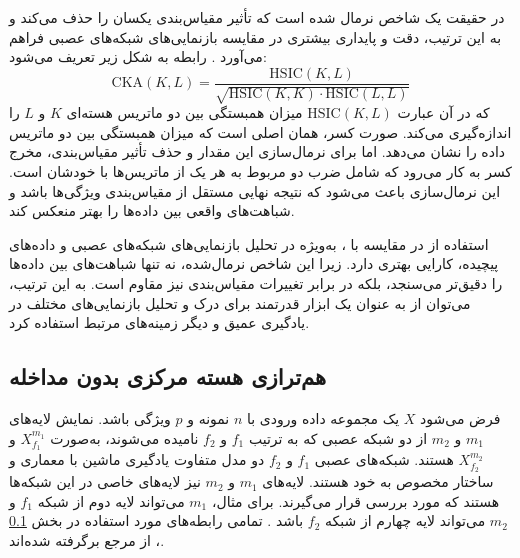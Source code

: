 در حقیقت
یک شاخص نرمال‌ شده است که تأثیر مقیاس‌بندی یکسان را حذف می‌کند و به این ترتیب، دقت و پایداری بیشتری در مقایسه بازنمایی‌های شبکه‌های عصبی فراهم می‌آورد
\cite{cortes2012algorithms, cristianini2001kernel}.
رابطه
به شکل زیر تعریف می‌شود:
\begin{equation}
	\text{CKA}(K, L) = \frac{\text{HSIC}(K, L)}{\sqrt{\text{HSIC}(K, K) \cdot \text{HSIC}(L, L)}}
	\label{eq_CKA}
\end{equation}
که در آن عبارت \(\text{HSIC}(K, L)\) میزان همبستگی بین دو ماتریس هسته‌ای \(K\) و \(L\) را اندازه‌گیری می‌کند. صورت کسر، همان
اصلی است که میزان همبستگی بین دو ماتریس داده را نشان می‌دهد. اما برای نرمال‌سازی این مقدار و حذف تأثیر مقیاس‌بندی، مخرج کسر به کار می‌رود که شامل ضرب دو
مربوط به هر یک از ماتریس‌ها با خودشان است. این نرمال‌سازی باعث می‌شود که نتیجه نهایی مستقل از مقیاس‌بندی ویژگی‌ها باشد و شباهت‌های واقعی بین داده‌ها را بهتر منعکس کند.

استفاده از
در مقایسه با
%
، به‌ویژه در تحلیل بازنمایی‌های شبکه‌های عصبی و داده‌های پیچیده، کارایی بهتری دارد. زیرا این شاخص نرمال‌شده، نه تنها شباهت‌های بین داده‌ها را دقیق‌تر می‌سنجد، بلکه در برابر تغییرات مقیاس‌بندی نیز مقاوم است. به این ترتیب، می‌توان از
به عنوان یک ابزار قدرتمند برای درک و تحلیل بازنمایی‌های مختلف در یادگیری عمیق و دیگر زمینه‌های مرتبط استفاده کرد.




\subsection{
	هم‌ترازی هسته مرکزی بدون مداخله%
}\label{sec_dCKA}
فرض می‌شود \(X\) یک مجموعه داده ورودی با \(n\) نمونه و \(p\) ویژگی باشد. نمایش‌ لایه‌های \(m_1\) و \(m_2\) از دو شبکه عصبی که به ترتیب \(f_1\) و \(f_2\) نامیده می‌شوند، به‌صورت \(X^{m_1}_{f_1}\) و \(X^{m_2}_{f_2}\) هستند. شبکه‌های عصبی \(f_1\) و \(f_2\) دو مدل متفاوت یادگیری ماشین با معماری و ساختار مخصوص به خود هستند. لایه‌های \(m_1\) و \(m_2\) نیز لایه‌های خاصی در این شبکه‌ها هستند که مورد بررسی قرار می‌گیرند. برای مثال، \(m_1\) می‌تواند لایه دوم از شبکه \(f_1\) و \(m_2\) می‌تواند لایه چهارم از شبکه \(f_2\) باشد
\cite{cui2022deconfounded}.
تمامی رابطه‌های مورد استفاده در بخش
\ref{sec_dCKA}%
، از مرجع 
\cite{cui2022deconfounded} 
برگرفته شده‌اند.

